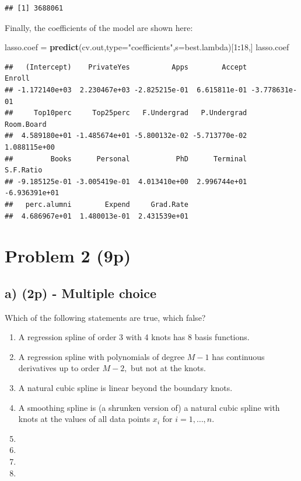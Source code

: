 \documentclass[]{article}
\newenvironment{Shaded}{\begin{snugshade}}{\end{snugshade}}
\newcommand{\DataTypeTok}[1]{\textcolor[rgb]{0.13,0.29,0.53}{#1}}
\newcommand{\DecValTok}[1]{\textcolor[rgb]{0.00,0.00,0.81}{#1}}
\newcommand{\KeywordTok}[1]{\textcolor[rgb]{0.13,0.29,0.53}{\textbf{#1}}}
\newcommand{\NormalTok}[1]{#1}
\newcommand{\OperatorTok}[1]{\textcolor[rgb]{0.81,0.36,0.00}{\textbf{#1}}}
\newcommand{\StringTok}[1]{\textcolor[rgb]{0.31,0.60,0.02}{#1}}
\begin{document}
\begin{verbatim}
## [1] 3688061
\end{verbatim}

Finally, the coefficients of the model are shown here:

\begin{Shaded}
\begin{Highlighting}[]
\NormalTok{lasso.coef =}\StringTok{ }\KeywordTok{predict}\NormalTok{(cv.out,}\DataTypeTok{type=}\StringTok{"coefficients"}\NormalTok{,}\DataTypeTok{s=}\NormalTok{best.lambda)[}\DecValTok{1}\OperatorTok{:}\DecValTok{18}\NormalTok{,]}
\NormalTok{lasso.coef}
\end{Highlighting}
\end{Shaded}

\begin{verbatim}
##   (Intercept)    PrivateYes          Apps        Accept        Enroll 
## -1.172140e+03  2.230467e+03 -2.825215e-01  6.615811e-01 -3.778631e-01 
##     Top10perc     Top25perc   F.Undergrad   P.Undergrad    Room.Board 
##  4.589180e+01 -1.485674e+01 -5.800132e-02 -5.713770e-02  1.088115e+00 
##         Books      Personal           PhD      Terminal     S.F.Ratio 
## -9.185125e-01 -3.005419e-01  4.013410e+00  2.996744e+01 -6.936391e+01 
##   perc.alumni        Expend     Grad.Rate 
##  4.686967e+01  1.480013e-01  2.431539e+01
\end{verbatim}

\hypertarget{problem-2-9p}{%
\section{Problem 2 (9p)}\label{problem-2-9p}}

\hypertarget{a-2p---multiple-choice}{%
\subsection{a) (2p) - Multiple choice}\label{a-2p---multiple-choice}}

Which of the following statements are true, which false?

\begin{enumerate}
\def\labelenumi{(\roman{enumi})}
\item
  A regression spline of order 3 with 4 knots has 8 basis functions.
\item
  A regression spline with polynomials of degree \(M-1\) has continuous
  derivatives up to order \(M-2,\) but not at the knots.
\item
  A natural cubic spline is linear beyond the boundary knots.
\item
  A smoothing spline is (a shrunken version of) a natural cubic spline
  with knots at the values of all data points \(x_i\) for
  \(i=1,\ldots ,n\).
\item
\item
\item
\item
\end{enumerate}
\end{document}
